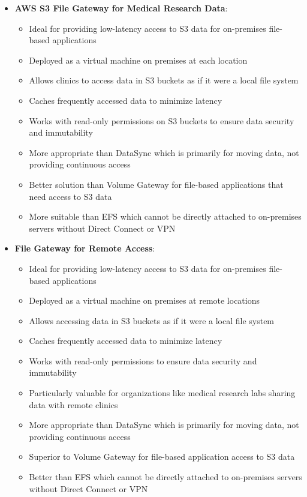 \documentclass[11pt,a4paper]{report}
\begin{document}
\begin{itemize}
  \item \textbf{AWS S3 File Gateway for Medical Research Data}:
\begin{itemize}
  \item Ideal for providing low-latency access to S3 data for on-premises file-based applications
  \item Deployed as a virtual machine on premises at each location
  \item Allows clinics to access data in S3 buckets as if it were a local file system
  \item Caches frequently accessed data to minimize latency
  \item Works with read-only permissions on S3 buckets to ensure data security and immutability
  \item More appropriate than DataSync which is primarily for moving data, not providing continuous access
  \item Better solution than Volume Gateway for file-based applications that need access to S3 data
  \item More suitable than EFS which cannot be directly attached to on-premises servers without Direct Connect or VPN
\end{itemize}
  \item \textbf{File Gateway for Remote Access}:
\begin{itemize}
  \item Ideal for providing low-latency access to S3 data for on-premises file-based applications
  \item Deployed as a virtual machine on premises at remote locations
  \item Allows accessing data in S3 buckets as if it were a local file system
  \item Caches frequently accessed data to minimize latency
  \item Works with read-only permissions to ensure data security and immutability
  \item Particularly valuable for organizations like medical research labs sharing data with remote clinics
  \item More appropriate than DataSync which is primarily for moving data, not providing continuous access
  \item Superior to Volume Gateway for file-based application access to S3 data
  \item Better than EFS which cannot be directly attached to on-premises servers without Direct Connect or VPN

\end{itemize}
\end{itemize}
\end{document}
